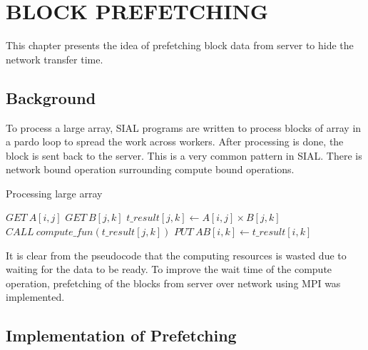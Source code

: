 \chapter{BLOCK PREFETCHING} \label{block prefetching}

This chapter presents the idea of prefetching block data from server to hide the
network transfer time.

\section{Background}
To process a large array, SIAL programs are written to process blocks of array
in a pardo loop to spread the work across workers. After processing is done, the
block is sent back to the server. This is a very common pattern in SIAL. There
is network bound operation surrounding compute bound operations.

\begin{algorithm}  {Processing large array}
\singlespacing

\begin{algorithmic}[1]
\Loop{}
\State $GET\ A[i, j]$
\State $GET\ B[j, k]$
\State $t\_result[j, k] \gets A[i, j] \times B[j, k]$
\State $CALL\ compute\_fun(t\_result[j, k])$
\State $PUT\ AB[i, k] \gets t\_result[i, k]$
\EndLoop
\end{algorithmic}
\end{algorithm}

It is clear from the pseudocode that the computing resources is wasted due to
waiting for the data to be ready. To improve the wait time of the compute
operation, prefetching of the blocks from server over network using MPI was
implemented.

\section{Implementation of Prefetching}

